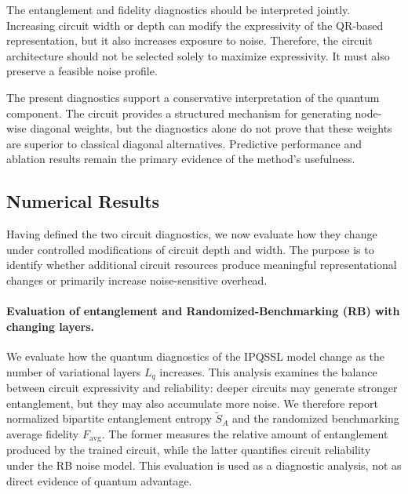 \documentclass[11pt,a4paper]{article}
\begin{document}
The entanglement and fidelity diagnostics should be interpreted jointly. Increasing circuit width or depth can modify the expressivity of the QR-based representation, but it also increases exposure to noise. Therefore, the circuit architecture should not be selected solely to maximize expressivity. It must also preserve a feasible noise profile.

The present diagnostics support a conservative interpretation of the quantum component. The circuit provides a structured mechanism for generating node-wise diagonal weights, but the diagnostics alone do not prove that these weights are superior to classical diagonal alternatives. Predictive performance and ablation results remain the primary evidence of the method's usefulness.

\subsection{Numerical Results}
\label{sec:numerical_results}

Having defined the two circuit diagnostics, we now evaluate how they change
under controlled modifications of circuit depth and width. The purpose is to
identify whether additional circuit resources produce meaningful
representational changes or primarily increase noise-sensitive overhead.

\paragraph{Evaluation of entanglement and Randomized-Benchmarking (RB) with changing layers.}
We evaluate how the quantum diagnostics of the IPQSSL model change as the number of variational layers $L_q$ increases. This analysis examines the balance between circuit expressivity and reliability: deeper circuits may generate stronger entanglement, but they may also accumulate more noise. We therefore report normalized bipartite entanglement entropy $\widetilde{S}_A$ and the randomized benchmarking average fidelity $F_{\mathrm{avg}}$. The former measures the relative amount of entanglement produced by the trained circuit, while the latter quantifies circuit reliability under the RB noise model. This evaluation is used as a diagnostic analysis, not as direct evidence of quantum advantage.
\end{document}
